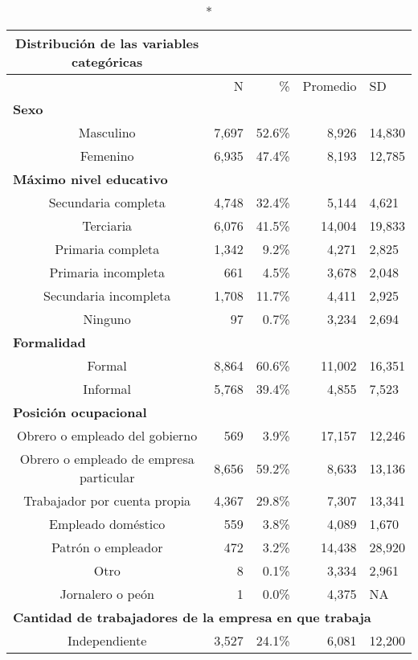 \centering \footnotesize \setlength{\tabcolsep}{4pt} \renewcommand{\arraystretch}{0.8}
\begingroup
\fontsize{7.0pt}{8.5pt}\selectfont
\begin{longtable}{crrrl}
\caption*{
{\large Distribución de las variables categóricas}
} \\ 
\toprule
  & N & \% & Promedio & SD \\ 
\multicolumn{5}{l}{{\bfseries Sexo}} \\[2.5pt] 
Masculino & 7,697 & 52.6\% & 8,926 & 14,830 \\ 
Femenino & 6,935 & 47.4\% & 8,193 & 12,785 \\ 
\multicolumn{5}{l}{{\bfseries Máximo nivel educativo}} \\[2.5pt] 
Secundaria completa & 4,748 & 32.4\% &  5,144 &  4,621 \\ 
Terciaria & 6,076 & 41.5\% & 14,004 & 19,833 \\ 
Primaria completa & 1,342 &  9.2\% &  4,271 &  2,825 \\ 
Primaria incompleta &   661 &  4.5\% &  3,678 &  2,048 \\ 
Secundaria incompleta & 1,708 & 11.7\% &  4,411 &  2,925 \\ 
Ninguno &    97 &  0.7\% &  3,234 &  2,694 \\ 
\multicolumn{5}{l}{{\bfseries Formalidad}} \\[2.5pt] 
Formal & 8,864 & 60.6\% & 11,002 & 16,351 \\ 
Informal & 5,768 & 39.4\% &  4,855 &  7,523 \\ 
\multicolumn{5}{l}{{\bfseries Posición ocupacional}} \\[2.5pt] 
Obrero o empleado del gobierno &   569 &  3.9\% & 17,157 & 12,246 \\ 
Obrero o empleado de empresa particular & 8,656 & 59.2\% &  8,633 & 13,136 \\ 
Trabajador por cuenta propia & 4,367 & 29.8\% &  7,307 & 13,341 \\ 
Empleado doméstico &   559 &  3.8\% &  4,089 &  1,670 \\ 
Patrón o empleador &   472 &  3.2\% & 14,438 & 28,920 \\ 
Otro &     8 &  0.1\% &  3,334 &  2,961 \\ 
Jornalero o peón &     1 &  0.0\% &  4,375 &     NA \\ 
\multicolumn{5}{l}{{\bfseries Cantidad de trabajadores
de la empresa en que trabaja}} \\[2.5pt] 
Independiente & 3,527 & 24.1\% &  6,081 & 12,200 \\ 

\end{longtable}
